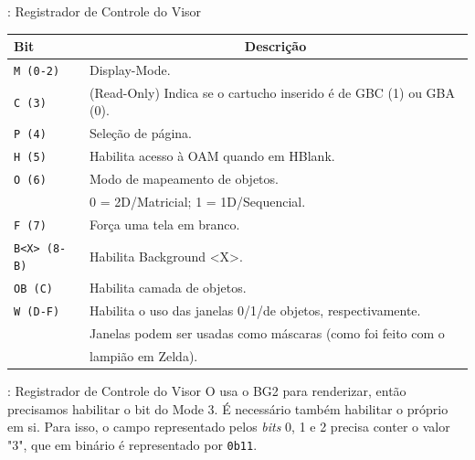 \documentclass{beamer}
\let\emph\relax %
\begin{document}
\begin{darkframes}
\begin{frame}{\secname: Registrador de Controle do Visor}
        \scriptsize{\begin{center}
            \begin{tabular}{|l|l|}
                \hline
                Bit & \multicolumn{1}{|c|}{Descrição} \\\hline
                \rowcolor[rgb]{.9,.6,.6}\texttt{M (0-2)} & Display-Mode. \\\hline
                \texttt{C (3)} & (Read-Only) Indica se o cartucho inserido é de GBC (1) ou GBA (0). \\\hline
                \texttt{P (4)} & Seleção de página. \\\hline
                \texttt{H (5)} & Habilita acesso à OAM quando em HBlank. \\\hline
                \texttt{O (6)} & Modo de mapeamento de objetos.\\
                               & 0 = 2D/Matricial; 1 = 1D/Sequencial. \\\hline
                \texttt{F (7)} & Força uma tela em branco. \\\hline
                \rowcolor{cyan}\texttt{B<X> (8-B)} & Habilita Background <X>. \\\hline
                \texttt{OB (C)} & Habilita camada de objetos. \\\hline
                \texttt{W (D-F)} & Habilita o uso das janelas 0/1/de objetos, respectivamente. \\
                                 & Janelas podem ser usadas como máscaras (como foi feito com o \\
                                 & lampião em Zelda). \\\hline
            \end{tabular}
        \end{center}}
    \end{frame}

    \begin{frame}{\secname: Registrador de Controle do Visor}
        O \emph{Mode 3} usa o BG2 para renderizar, então precisamos habilitar o bit do Mode 3.
        É necessário também habilitar o próprio \emph{Mode 3} em si. Para isso,
        o campo representado pelos \textit{bits} 0, 1 e 2 precisa conter o valor "3",
        que em binário é representado por \texttt{0b11}.


\end{frame}
\end{darkframes}
\end{document}
